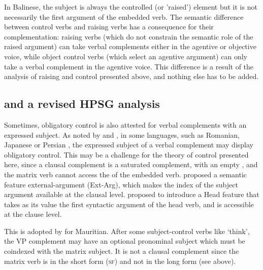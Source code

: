 \documentclass[output=paper
	        ,collection
	        ,collectionchapter
 	        ,biblatex
                ,babelshorthands
                ,newtxmath
                ,draftmode
                ,colorlinks, citecolor=brown
]{langscibook}
\begin{document}
In Balinese, the subject is always the controlled (or 'raised') element but it is not necessarily the first argument of the embedded verb. The semantic difference between control verbs and raising verbs has a consequence for their complementation: raising verbs (which do not constrain the semantic role of the raised argument) can take verbal complements either in the agentive or objective voice, while object control verbs (which select an agentive argument) can only take a verbal complement in the agentive voice. This difference is a result of the analysis of raising and control presented above, and nothing else has to be added.



\subsection{\xarg and a revised HPSG analysis}\label{section-xarg}

Sometimes, obligatory control is also attested for verbal complements with an expressed subject. 
As noted by \citet{Zec87a-u,Farkas1988} and \citet[--116]{GH2001a-u}, in some languages,  such as Romanian, Japanese  \citep{Kuno76a-u,Iida96a-u} or Persian \citep{Karimi2008},  the expressed subject of a verbal complement
may display obligatory control. This may be a challenge for the theory of control presented here, since a clausal complement is a
saturated complement, with an empty \subjl, and the matrix verb cannot access the \subjv of the
embedded verb. \citet[]{SP91a-u} proposed a semantic feature external-argument (Ext-Arg), which makes the index of the subject argument available at the clausal level.  \citet{Sag2007a} proposed to introduce a Head
feature \xarg that takes as its value the first syntactic argument of the head verb, and is
accessible at the clause level. 

This is adopted by \citet{HenriandLaurens2011} for Mauritian.  After some subject-control verbs
like  `think', the VP complement may have an optional pronominal subject which must be coindexed with the matrix subject. It is not a clausal complement since the matrix verb is in the short form (\textsc{sf}) and not in the long form (see above).
\end{document}
